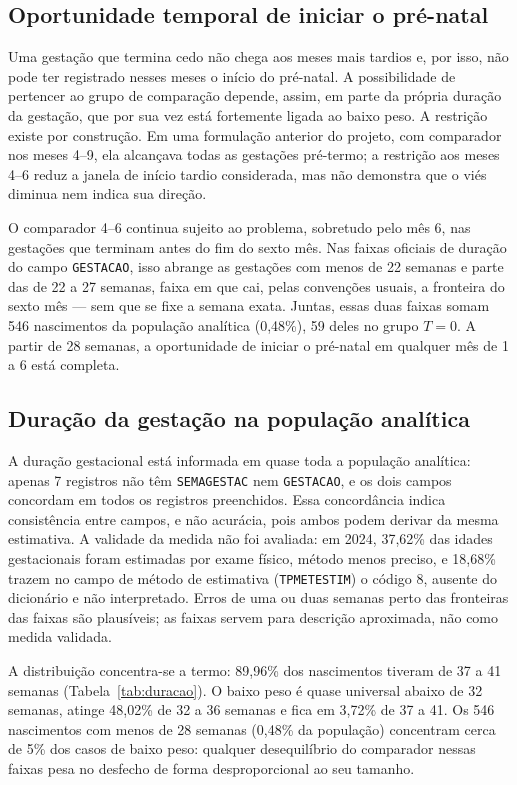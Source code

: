 \documentclass[11pt,a4paper]{article}
\newcommand{\campo}[1]{\texttt{#1}}       %
\begin{document}
\subsection{Oportunidade temporal de iniciar o pré-natal}

Uma gestação que termina cedo não chega aos meses mais tardios e, por isso, não pode ter
registrado nesses meses o início do pré-natal. A possibilidade de pertencer ao grupo de
comparação depende, assim, em parte da própria duração da gestação, que por sua vez está
fortemente ligada ao baixo peso. A restrição existe por construção. Em uma formulação
anterior do projeto, com comparador nos meses 4--9, ela alcançava todas as gestações
pré-termo; a restrição aos meses 4--6 reduz a janela de início tardio considerada, mas não
demonstra que o viés diminua nem indica sua direção.

O comparador 4--6 continua sujeito ao problema, sobretudo pelo mês 6, nas gestações que
terminam antes do fim do sexto mês. Nas faixas oficiais de duração do campo
\campo{GESTACAO}, isso abrange as gestações com menos de 22 semanas e parte das de 22 a 27
semanas, faixa em que cai, pelas convenções usuais, a fronteira do sexto mês --- sem que
se fixe a semana exata. Juntas, essas duas faixas somam 546 nascimentos da população
analítica (0,48\%), 59 deles no grupo $T=0$. A partir de 28 semanas, a oportunidade de
iniciar o pré-natal em qualquer mês de 1 a 6 está completa.

\subsection{Duração da gestação na população analítica}

A duração gestacional está informada em quase toda a população analítica: apenas 7
registros não têm \campo{SEMAGESTAC} nem \campo{GESTACAO}, e os dois campos concordam em
todos os registros preenchidos. Essa concordância indica consistência entre campos, e não
acurácia, pois ambos podem derivar da mesma estimativa. A validade da medida não foi
avaliada: em 2024, 37,62\% das idades gestacionais foram estimadas por exame físico,
método menos preciso, e 18,68\% trazem no campo de método de estimativa
(\campo{TPMETESTIM}) o código 8, ausente do dicionário e não interpretado. Erros de uma ou
duas semanas perto das fronteiras das faixas são plausíveis; as faixas servem para
descrição aproximada, não como medida validada.

A distribuição concentra-se a termo: 89,96\% dos nascimentos tiveram de 37 a 41 semanas
(Tabela~\ref{tab:duracao}). O baixo peso é quase universal abaixo de 32 semanas, atinge
48,02\% de 32 a 36 semanas e fica em 3,72\% de 37 a 41. Os 546 nascimentos com menos de 28
semanas (0,48\% da população) concentram cerca de 5\% dos casos de baixo peso: qualquer
desequilíbrio do comparador nessas faixas pesa no desfecho de forma desproporcional ao seu
tamanho.
\end{document}
